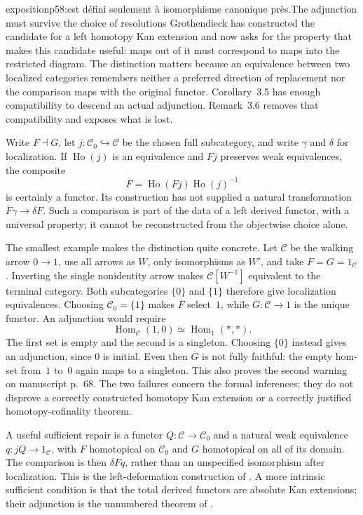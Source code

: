 \begin{dcomment}{exposition}{p58:est défini seulement à isomorphisme canonique près.}{The adjunction must survive the choice of resolutions}
Grothendieck has constructed the candidate for a left homotopy Kan extension and now asks for the property that makes this candidate useful: maps out of it must correspond to maps into the restricted diagram. The distinction matters because an equivalence between two localized categories remembers neither a preferred direction of replacement nor the comparison maps with the original functor. Corollary~3.5 has enough compatibility to descend an actual adjunction. Remark~3.6 removes that compatibility and exposes what is lost.

Write $F\dashv G$, let $j:\mathcal C_0\hookrightarrow\mathcal C$ be the chosen full subcategory, and write $\gamma$ and $\delta$ for localization. If $\operatorname{Ho}(j)$ is an equivalence and $Fj$ preserves weak equivalences, the composite
\[
 \overline F=\operatorname{Ho}(Fj)\operatorname{Ho}(j)^{-1}
\]
is certainly a functor. Its construction has not supplied a natural transformation $\overline F\gamma\to\delta F$. Such a comparison is part of the data of a left derived functor, with a universal property; it cannot be reconstructed from the objectwise choice alone.

The smallest example makes the distinction quite concrete. Let $\mathcal C$ be the walking arrow $0\to1$, use all arrows as $W$, only isomorphisms as $W'$, and take $F=G=1_{\mathcal C}$. Inverting the single nonidentity arrow makes $\mathcal C[W^{-1}]$ equivalent to the terminal category. Both subcategories $\{0\}$ and $\{1\}$ therefore give localization equivalences. Choosing $\mathcal C_0=\{1\}$ makes $\overline F$ select~$1$, while $\overline G:\mathcal C\to1$ is the unique functor. An adjunction would require
\[
 \operatorname{Hom}_{\mathcal C}(1,0)
 \simeq \operatorname{Hom}_{1}(*,*) .
\]
The first set is empty and the second is a singleton. Choosing $\{0\}$ instead gives an adjunction, since $0$ is initial. Even then $\overline G$ is not fully faithful: the empty hom-set from~$1$ to~$0$ again maps to a singleton. This also proves the second warning on manuscript p.~68. The two failures concern the formal inferences; they do not disprove a correctly constructed homotopy Kan extension or a correctly justified homotopy-cofinality theorem.

A useful sufficient repair is a functor $Q:\mathcal C\to\mathcal C_0$ and a natural weak equivalence $q:jQ\to1_{\mathcal C}$, with $F$ homotopical on $\mathcal C_0$ and $G$ homotopical on all of its domain. The comparison is then $\delta Fq$, rather than an unspecified isomorphism after localization. This is the left-deformation construction of \citet[Theorems~2.2.8 and~2.2.11]{Riehl2014}. A more intrinsic sufficient condition is that the total derived functors are absolute Kan extensions; their adjunction is the unnumbered theorem of \citet{Maltsiniotis2007Adjunction}.


\end{dcomment}
